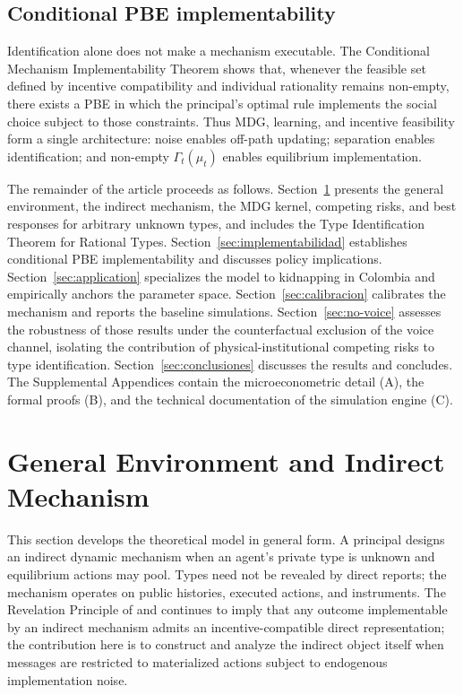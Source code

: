 \documentclass[pdflatex,sn-mathphys-ay]{sn-jnl}
\theoremstyle{plain}
\theoremstyle{definition}
\newcommand{\1}{\mathbf{1}}
\begin{document}
\subsection*{Conditional PBE implementability}
Identification alone does not make a mechanism executable. The Conditional Mechanism Implementability Theorem shows that, whenever the feasible set defined by incentive compatibility and individual rationality remains non-empty, there exists a PBE in which the principal's optimal rule implements the social choice subject to those constraints. Thus MDG, learning, and incentive feasibility form a single architecture: noise enables off-path updating; separation enables identification; and non-empty $\Gamma_t(\mu_t)$ enables equilibrium implementation.

The remainder of the article proceeds as follows. Section~\ref{sec:model} presents the general environment, the indirect mechanism, the MDG kernel, competing risks, and best responses for arbitrary unknown types, and includes the Type Identification Theorem for Rational Types. Section~\ref{sec:implementabilidad} establishes conditional PBE implementability and discusses policy implications. Section~\ref{sec:application} specializes the model to kidnapping in Colombia and empirically anchors the parameter space. Section~\ref{sec:calibracion} calibrates the mechanism and reports the baseline simulations. Section~\ref{sec:no-voice} assesses the robustness of those results under the counterfactual exclusion of the voice channel, isolating the contribution of physical-institutional competing risks to type identification. Section~\ref{sec:conclusiones} discusses the results and concludes. The Supplemental Appendices contain the microeconometric detail (A), the formal proofs (B), and the technical documentation of the simulation engine (C).


\section{General Environment and Indirect Mechanism}\label{sec:model}

This section develops the theoretical model in general form. A principal designs an indirect dynamic mechanism when an agent's private type is unknown and equilibrium actions may pool. Types need not be revealed by direct reports; the mechanism operates on public histories, executed actions, and instruments. The Revelation Principle of \citet{Gibbard1973} and \citet{Myerson1979IC,Myerson1981} continues to imply that any outcome implementable by an indirect mechanism admits an incentive-compatible direct representation; the contribution here is to construct and analyze the indirect object itself when messages are restricted to materialized actions subject to endogenous implementation noise.
\end{document}
